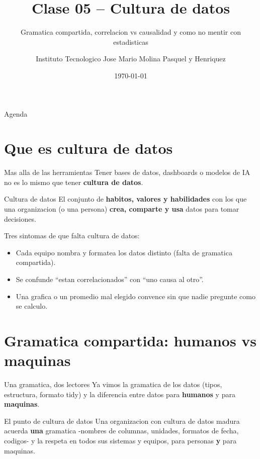 \documentclass[aspectratio=169]{beamer}
\title{Clase 05 -- Cultura de datos}
\subtitle{Gramatica compartida, correlacion vs causalidad y como no mentir con estadisticas}
\author{Instituto Tecnologico Jose Mario Molina Pasquel y Henriquez}
\date{\today}
\begin{document}
\begin{frame}[plain]
  \titlepage
\end{frame}

\begin{frame}{Agenda}
  \tableofcontents
\end{frame}

\section{Que es cultura de datos}

\begin{frame}{Mas alla de las herramientas}
  Tener bases de datos, dashboards o modelos de IA no es lo mismo que tener
  \textbf{cultura de datos}.
  \begin{block}{Cultura de datos}
    El conjunto de \textbf{habitos, valores y habilidades} con los que una
    organizacion (o una persona) \textbf{crea, comparte y usa} datos para
    tomar decisiones.
  \end{block}
  \vspace{0.3em}
  Tres sintomas de que falta cultura de datos:
  \begin{itemize}
    \item Cada equipo nombra y formatea los datos distinto (falta de gramatica
          compartida).
    \item Se confunde ``estan correlacionados'' con ``uno causa al otro''.
    \item Una grafica o un promedio mal elegido convence sin que nadie
          pregunte como se calculo.
  \end{itemize}
\end{frame}

\section{Gramatica compartida: humanos vs maquinas}

\begin{frame}{Una gramatica, dos lectores}
  Ya vimos la gramatica de los datos (tipos, estructura, formato tidy) y la
  diferencia entre datos para \textbf{humanos} y para \textbf{maquinas}.
  \begin{block}{El punto de cultura de datos}
    Una organizacion con cultura de datos madura acuerda \textbf{una} gramatica
    -nombres de columnas, unidades, formatos de fecha, codigos- y la respeta en
    todos sus sistemas y equipos, para personas \textbf{y} para maquinas.
  \end{block}
\end{frame}
\end{document}
